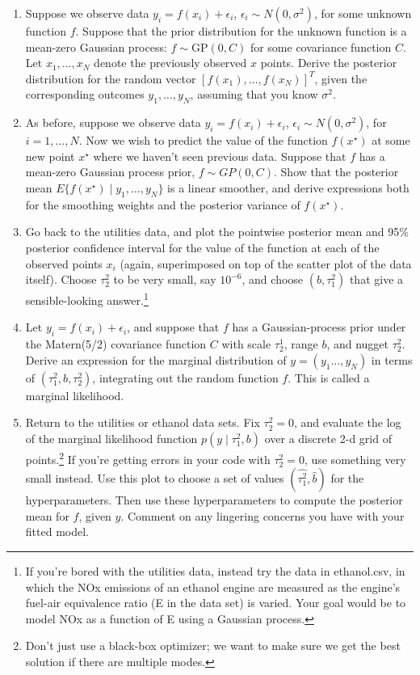 \documentclass{homework}
\begin{document}
\begin{enumerate}[label=(\Alph*)]

\item Suppose we observe data $y_i = f(x_i) + \epsilon_i$, $\epsilon_i \sim N(0, \sigma^2)$, for some unknown function $f$. Suppose that the prior distribution for the unknown function is a mean-zero Gaussian process: $f \sim \mbox{GP}(0, C)$ for some covariance function $C$.  Let $x_1, \ldots, x_N$ denote the previously observed $x$ points.  Derive the posterior distribution for the random vector $[f(x_1), \ldots, f(x_N)]^T$, given the corresponding outcomes $y_1, \ldots, y_N$, assuming that you know $\sigma^2$.

\item As before, suppose we observe data $y_i = f(x_i) + \epsilon_i$, $\epsilon_i \sim N(0, \sigma^2)$, for $i=1, \ldots, N$.  Now we wish to predict the value of the function $f(x^{\star})$ at some new point $x^{\star}$ where we haven't seen previous data.  Suppose that $f$ has a mean-zero Gaussian process prior, $f \sim GP(0, C)$.  Show that the posterior mean $E\{ f(x^{\star}) \mid y_1, \ldots, y_N \}$ is a linear smoother, and derive expressions both for the smoothing weights and the posterior variance of $f(x^{\star})$.

\item Go back to the utilities data, and plot the pointwise posterior mean and 95\% posterior confidence interval for the value of the function at each of the observed points $x_i$ (again, superimposed on top of the scatter plot of the data itself).  Choose $\tau^2_2$ to be very small, say $10^{-6}$, and choose $(b, \tau^2_1)$ that give a sensible-looking answer.\footnote{If you're bored with the utilities data, instead try the data in ethanol.csv, in which the NOx emissions of an ethanol engine are measured as the engine's fuel-air equivalence ratio (E in the data set) is varied.  Your goal would be to model NOx as a function of E using a Gaussian process. }

\item Let $y_i = f(x_i) + \epsilon_i$, and suppose that $f$ has a Gaussian-process prior under the Matern(5/2) covariance function $C$ with scale $\tau^1_2$, range $b$, and nugget $\tau^2_2$.  Derive an expression for the marginal distribution of $y = (y_1 \ldots, y_N)$ in terms of $(\tau^2_1, b, \tau^2_2)$, integrating out the random function $f$.  This is called a marginal likelihood.

\item Return to the utilities or ethanol data sets. Fix $\tau^2_2 = 0$, and evaluate the log of the marginal likelihood function $p(y \mid \tau^2_1, b)$ over a discrete 2-d grid of points.\footnote{Don't just use a black-box optimizer; we want to make sure we get the best solution if there are multiple modes.} If you're getting errors in your code with $\tau^2_2 = 0$, use something very small instead.  Use this plot to choose a set of values $(\hat{\tau^2_1}, \hat{b})$ for the hyperparameters.  Then use these hyperparameters to compute the posterior mean for $f$, given $y$.  Comment on any lingering concerns you have with your fitted model.


\end{enumerate}
\end{document}
